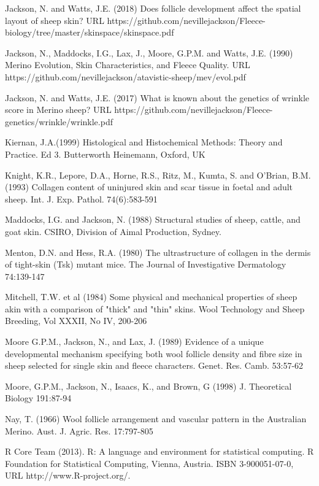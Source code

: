 \documentclass[titlepage]{article}  %
\begin{document}
\begin{thebibliography}{99}
Jackson, N. and Watts, J.E. (2018) Does follicle development affect the spatial layout of sheep skin? URL https://github.com/nevillejackson/Fleece-biology/tree/master/skinspace/skinspace.pdf

Jackson, N., Maddocks, I.G., Lax, J., Moore, G.P.M. and Watts, J.E. (1990) Merino Evolution, Skin Characteristics, and Fleece Quality. URL https://github.com/nevillejackson/atavistic-sheep/mev/evol.pdf 

Jackson, N. and Watts, J.E. (2017) What is known about the genetics of wrinkle score in Merino sheep? URL https://github.com/nevillejackson/Fleece-genetics/wrinkle/wrinkle.pdf

Kiernan, J.A.(1999) Histological and Histochemical Methods: Theory and Practice. Ed 3. Butterworth Heinemann, Oxford, UK

Knight, K.R., Lepore, D.A., Horne, R.S., Ritz, M., Kumta, S. and O'Brian, B.M. (1993) Collagen content of uninjured skin and scar tissue in foetal and adult sheep. Int. J. Exp. Pathol. 74(6):583-591

Maddocks, I.G. and Jackson, N. (1988) Structural studies of sheep, cattle, and goat skin. CSIRO, Division of Aimal Production, Sydney.

Menton, D.N. and Hess, R.A. (1980) The ultrastructure of collagen in the dermis of tight-skin (Tsk) mutant mice. The Journal of Investigative Dermatology 74:139-147

Mitchell, T.W. et al (1984) Some physical and mechanical properties of sheep akin with a comparison of "thick" and "thin" skins. Wool Technology and Sheep Breeding, Vol XXXII, No IV, 200-206

Moore G.P.M., Jackson, N., and Lax, J. (1989) Evidence of a unique developmental mechanism specifying both wool follicle density and fibre size in sheep selected for single skin and fleece characters. Genet. Res. Camb. 53:57-62

Moore, G.P.M., Jackson, N., Isaacs, K., and Brown, G (1998) J. Theoretical Biology 191:87-94

Nay, T. (1966) Wool follicle arrangement and vascular pattern in the Australian Merino. Aust. J. Agric. Res. 17:797-805

R Core Team (2013). R: A language and environment for statistical
  computing. R Foundation for Statistical Computing, Vienna, Austria.
  ISBN 3-900051-07-0, URL http://www.R-project.org/.


\end{thebibliography}
\end{document}
